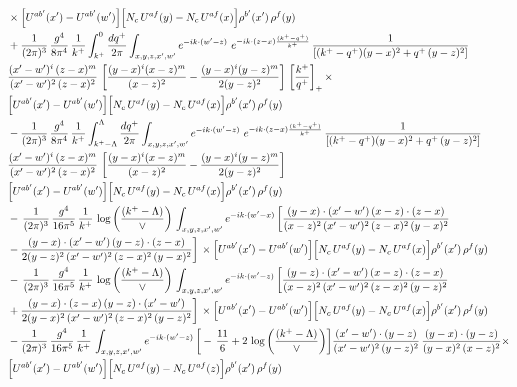 \documentclass[9pt]{article}
\numberwithin{equation}{section}
\begin{document}
\begin{align}
&\times\Big[U^{ab'}(x')-U^{ab'}(w')\Big]\Big[N_{c}\,U^{af}(y)-N_{c}\,U^{af}(x)\Big]\rho^{b'}(x')\,\rho^{f}(y)\notag \\ & + \frac{1}{(2\pi)^{3}}\,\frac{g^{4}}{8\pi^{4}}\,\frac{1}{k^{+}}\int_{k^{+}}^{0}\frac{dq^{+}}{2\pi}\int_{x,y,z,x',w'}e^{-ik\cdot(w'-z)}\ e^{-ik\cdot(z-x)\frac{(k^{+}-q^{+})}{k^{+}}}\,\frac{1}{\left[(k^{+}-q^{+})(y-x)^{2}+q^{+}\,(y-z)^{2}\right]}\notag \\ & \frac{(x'-w')^{i}\,(z-x)^{m}}{(x'-w')^{2}\,(z-x)^{2}}\,\left[\frac{(y-x)^{i}(x-z)^{m}}{(x-z)^{2}}-\frac{(y-x)^{i}(y-z)^{m}}{2(y-z)^{2}}\right]\,\left[\frac{k^{+}}{q^{+}}\right]_{+}\times\notag \\ & \Big[U^{ab'}(x')-U^{ab'}(w')\Big]\Big[N_{c}\,U^{af}(y)-N_{c}\,U^{af}(x)\Big]\rho^{b'}(x')\,\rho^{f}(y)\notag \\ & - \frac{1}{(2\pi)^{3}}\,\frac{g^{4}}{8\pi^{4}}\,\frac{1}{k^{+}}\int_{k^{+}-\Lambda}^{\Lambda}\frac{dq^{+}}{2\pi}\int_{x,y,z,x',w'}e^{-ik\cdot(w'-z)}\ e^{-ik\cdot(z-x)\frac{(k^{+}-q^{+})}{k^{+}}}\,\frac{1}{\left[(k^{+}-q^{+})(y-x)^{2}+q^{+}\,(y-z)^{2}\right]}\notag \\ & \frac{(x'-w')^{i}\,(z-x)^{m}}{(x'-w')^{2}\,(z-x)^{2}}\,\left[\frac{(y-x)^{i}(x-z)^{m}}{(x-z)^{2}}-\frac{(y-x)^{i}(y-z)^{m}}{2(y-z)^{2}}\right]\notag \\ & \Big[U^{ab'}(x')-U^{ab'}(w')\Big]\Big[N_{c}\,U^{af}(y)-N_{c}\,U^{af}(x)\Big]\rho^{b'}(x')\,\rho^{f}(y)\notag \\ & -\, \frac{1}{(2\pi)^{3}}\,\frac{g^{4}}{16\pi^{5}}\,\frac{1}{k^{+}}\, \log{\left(\frac{(k^{+}-\Lambda)}{\vee}\right)}\,\int_{x,y,z,x',w'}e^{-ik\cdot(w'-x)}\, \bigg[\frac{(y-x)\cdot (x'-w')\,(x-z)\cdot (z-x)}{(x-z)^{2}\,(x'-w')^{2}\,(z-x)^{2}\,(y-x)^{2}}\notag \\ & -\frac{(y-x)\cdot (x'-w')\,(y-z)\cdot (z-x)}{2(y-z)^{2}\,(x'-w')^{2}\,(z-x)^{2}\,(y-x)^{2}}\bigg]\,\times \Big[U^{ab'}(x')-U^{ab'}(w')\Big]\Big[N_{c}\,U^{af}(y)-N_{c}\,U^{af}(x)\Big]\rho^{b'}(x')\,\rho^{f}(y)\notag \\ & -\, \frac{1}{(2\pi)^{3}}\,\frac{g^{4}}{16\pi^{5}}\,\frac{1}{k^{+}}\,\log{\left(\frac{(k^{+}-\Lambda)}{\vee}\right)}\,\int_{x,y,z,x',w'}e^{-ik\cdot(w'-z)}\,\bigg[\frac{(y-z)\cdot (x'-w')\,(x-z)\cdot (z-x)}{(x-z)^{2}\,(x'-w')^{2}\,(z-x)^{2}\,(y-z)^{2}}\notag \\ & +\frac{(y-x)\cdot (z-x)\,(y-z)\cdot (x'-w')}{2(y-x)^{2}\,(x'-w')^{2}\,(z-x)^{2}\,(y-z)^{2}}\bigg]\,\times \Big[U^{ab'}(x')-U^{ab'}(w')\Big]\Big[N_{c}\,U^{af}(y)-N_{c}\,U^{af}(x)\Big]\rho^{b'}(x')\,\rho^{f}(y)\notag \\ & - \frac{1}{(2\pi)^{3}}\,\frac{g^{4}}{16\pi^{5}}\,\frac{1}{k^{+}}\,\int_{x,y,z,x',w'}e^{-ik\cdot(w'-z)}\,\bigg[-\,\frac{11}{6}+2\, \log{\left(\frac{(k^{+}-\Lambda)}{\vee}\right)}\bigg] \frac{(x'-w')\cdot(y-z)}{(x'-w')^{2}\,(y-z)^{2}}\,\frac{(y-x)\cdot(y-z)}{(y-x)^{2}\,(x-z)^{2}}\times\notag \\ & \Big[U^{ab'}(x')-U^{ab'}(w')\Big]\Big[N_{c}\,U^{af}(y)-N_{c}\,U^{af}(z)\Big]\rho^{b'}(x')\,\rho^{f}(y)
\end{align}
\end{document}
